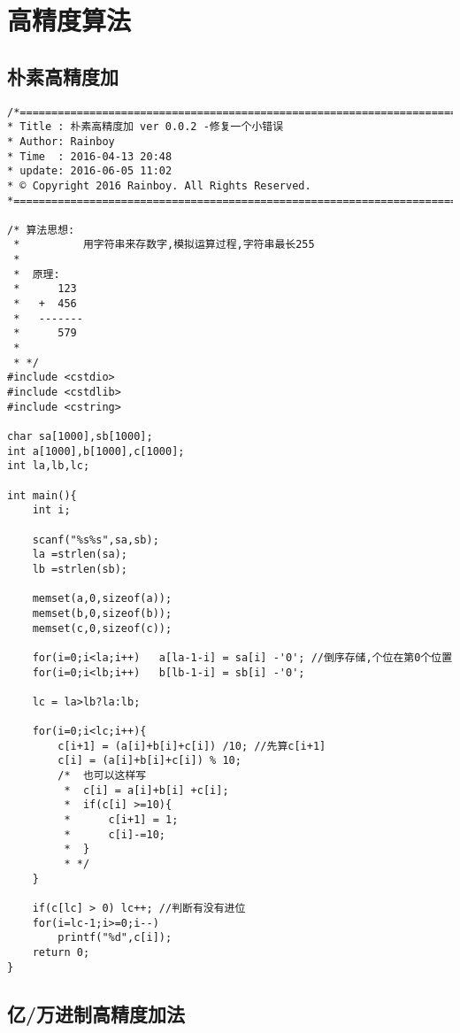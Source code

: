 \section{高精度算法}

\subsection{ 朴素高精度加}

\begin{lstlisting}
/*============================================================================
* Title : 朴素高精度加 ver 0.0.2 -修复一个小错误
* Author: Rainboy
* Time  : 2016-04-13 20:48
* update: 2016-06-05 11:02
* © Copyright 2016 Rainboy. All Rights Reserved.
*=============================================================================*/

/* 算法思想:
 *          用字符串来存数字,模拟运算过程,字符串最长255
 *  
 *  原理:
 *      123
 *   +  456
 *   -------
 *      579
 *
 * */
#include <cstdio>
#include <cstdlib>
#include <cstring>

char sa[1000],sb[1000];
int a[1000],b[1000],c[1000];
int la,lb,lc;

int main(){
    int i;

    scanf("%s%s",sa,sb);
    la =strlen(sa);
    lb =strlen(sb);

    memset(a,0,sizeof(a));
    memset(b,0,sizeof(b));
    memset(c,0,sizeof(c));

    for(i=0;i<la;i++)   a[la-1-i] = sa[i] -'0'; //倒序存储,个位在第0个位置
    for(i=0;i<lb;i++)   b[lb-1-i] = sb[i] -'0';

    lc = la>lb?la:lb;

    for(i=0;i<lc;i++){
        c[i+1] = (a[i]+b[i]+c[i]) /10; //先算c[i+1]
        c[i] = (a[i]+b[i]+c[i]) % 10;
        /*  也可以这样写
         *  c[i] = a[i]+b[i] +c[i];
         *  if(c[i] >=10){
         *      c[i+1] = 1;
         *      c[i]-=10;
         *  }
         * */
    }

    if(c[lc] > 0) lc++; //判断有没有进位
    for(i=lc-1;i>=0;i--)
        printf("%d",c[i]);
    return 0;
}
\end{lstlisting}


\subsection{亿/万进制高精度加法}

